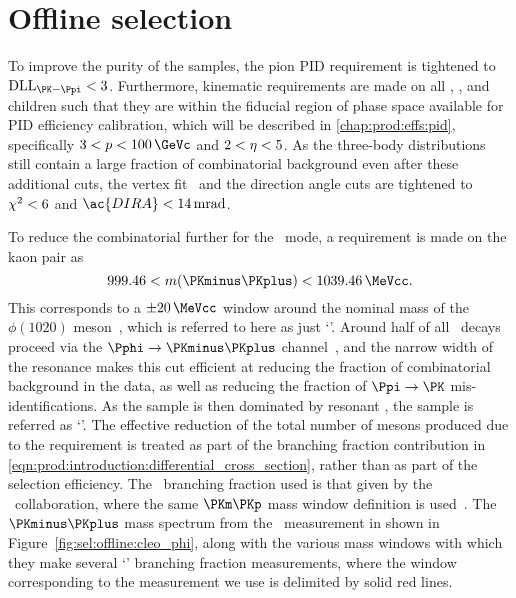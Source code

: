 \section{Offline selection}
\label{chap:prod:sel:offline}

To improve the purity of the samples, the pion \ac{PID} requirement is 
tightened to $\dllkpi < 3$.
Furthermore, kinematic requirements are made on all \PDzero, \PDplus, and 
\PDsplus children such that they are within the fiducial region of phase space 
available for \ac{PID} efficiency calibration, which will be described in 
\cref{chap:prod:effs:pid}, specifically $3 < \ptot < \SI{100}{\GeVc}$ and $2 < 
\eta < 5$.
As the three-body distributions still contain a large fraction of combinatorial 
background even after these additional cuts, the vertex fit \chisq\ and the 
direction angle cuts are tightened to $\chi^2 < 6$ and $\ac{DIRA} < 
\SI{14}{\milli\radian}$.

To reduce the combinatorial further for the \DspToKKpi\ mode, a requirement is 
made on the kaon pair as
\begin{equation}
  999.46 < m(\PKminus\PKplus) < \SI{1039.46}{\MeVcc}.
  \label{eqn:prod:sel:phi_cut}
\end{equation}
This corresponds to a $\pm\SI{20}{\MeVcc}$ window around the nominal mass of 
the $\phi(1020)$ meson~\cite{PDG2014}, which is referred to here as just 
`\Pphi'.
Around half of all \DspToKKpi\ decays proceed via the 
$\decay{\Pphi}{\PKminus\PKplus}$ channel~\cite{PDG2014}, and the narrow width 
of the \Pphi resonance makes this cut efficient at reducing the fraction of 
combinatorial background in the data, as well as reducing the fraction of $\Ppi 
\to \PK$ mis-identifications.
As the \DspToKKpi sample is then dominated by resonant \DspTophipi, the 
\PDsplus sample is referred as `\DspTophipi'.
The effective reduction of the total number of \PDsplus mesons produced due to 
the \Pphi requirement is treated as part of the branching fraction contribution 
in \cref{eqn:prod:introduction:differential_cross_section}, rather than as part 
of the selection efficiency.
The \DspTophipi\ branching fraction used is that given by the \cleo\ 
collaboration, where the same $\PKm\PKp$ mass window definition is 
used~\cite{Alexander:2008aa}.
The $\PKminus\PKplus$ mass spectrum from the \cleo\ measurement in shown in 
Figure~\ref{fig:sel:offline:cleo_phi}, along with the various mass windows with 
which they make several `\DspTophipi' branching fraction measurements, where 
the window corresponding to the measurement we use is delimited by solid red 
lines.

